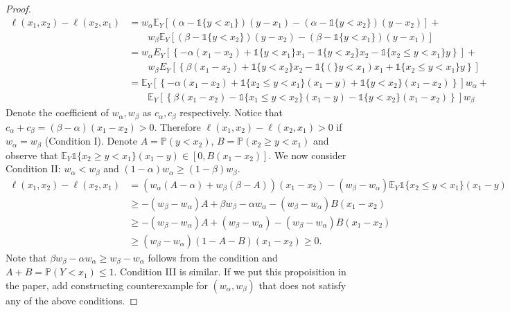 \documentclass{article}
\newcommand{\indi}[1]{\mathds{1}\{#1\}}
\newcommand{\E}{\mathbb{E}}
\renewcommand{\P}{\mathbb{P}}
\begin{document}
\begin{proof}
\begin{align*}
\ell(x_1, x_2) - \ell(x_2, x_1) 
& = w_\alpha \E_Y \left[(\alpha - \indi{y < x_1})(y-x_1) - (\alpha - \indi{y < x_2})(y-x_2) \right] + \\ 
& \qquad w_\beta \E_Y \left[(\beta - \indi{y < x_2})(y-x_2) - (\beta - \indi{y < x_1})(y-x_1) \right] \\
& = w_\alpha E_Y \left[\left\{-\alpha(x_1 - x_2) + \indi{y < x_1}x_1 - \indi{y < x_2}x_2 - \indi{x_2 \leq y < x_1}y \right\}\right] + \\
& \qquad w_\beta E_Y \left[ \left\{\beta(x_1 - x_2) + \indi{y < x_2}x_2 - \indi(y < x_1)x_1 + \indi{x_2 \leq y < x_1}y \right\} \right] \\
& = \E_Y \left[\left\{-\alpha(x_1 - x_2) + \indi{x_2 \leq y < x_1}(x_1 - y) + \indi{y < x_2}(x_1 - x_2)\right\} \right] w_\alpha + \\
& \qquad \E_Y \left[\left\{\beta(x_1 - x_2) - \indi{x_1 \leq y < x_2}(x_1 - y) - \indi{y < x_2}(x_1 - x_2)\right\} \right] w_\beta 
\end{align*}
Denote the coefficient of $w_\alpha, w_\beta$ as $c_\alpha, c_\beta$ respectively. Notice that $c_\alpha + c_\beta = (\beta-\alpha)(x_1 - x_2) > 0$. Therefore $\ell(x_1, x_2) - \ell(x_2, x_1) > 0$ if $w_\alpha = w_\beta$ (Condition I).
Denote $A = \P(y < x_2)$, $B = \P(x_2 \geq y < x_1)$ and observe that $\E_Y \indi{x_2 \geq y < x_1}(x_1 - y) \in [0, B(x_1 - x_2)]$.
We now consider Condition II: $w_\alpha < w_\beta$ and $(1-\alpha)w_\alpha \geq (1-\beta)w_\beta$. 
\begin{align*}
\ell(x_1, x_2) - \ell(x_2, x_1) 
& = \left(w_\alpha(A-\alpha) + w_\beta(\beta-A)\right)(x_1 - x_2) - (w_\beta - w_\alpha)\E_Y \indi{x_2 \leq y < x_1}(x_1 - y) \\
& \geq -(w_\beta - w_\alpha)A + \beta w_\beta - \alpha w_\alpha - (w_\beta - w_\alpha)B(x_1 - x_2) \\
& \geq -(w_\beta - w_\alpha)A + (w_\beta - w_\alpha) - (w_\beta - w_\alpha)B(x_1 - x_2) \\
& \geq (w_\beta - w_\alpha)(1-A-B)(x_1 - x_2) \geq 0.
\end{align*}
Note that $\beta w_\beta - \alpha w_\alpha \geq w_\beta - w_\alpha$ follows from the condition and $A+B = \P(Y < x_1) \leq 1$.
Condition III is similar.
{\color{red} If we put this propoisition in the paper, add constructing counterexample for $(w_\alpha, w_\beta)$ that does not satisfy any of the above conditions.}
\end{proof}
\end{document}
